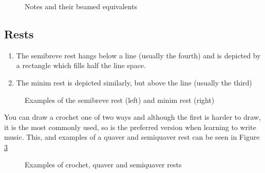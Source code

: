 \begin{figure}[h!]
  \centering
  \caption{Notes and their beamed equivalents}
  \label{fig:NotesBeamedEquiv}
\end{figure}


\subsection*{Rests}

\begin{enumerate}
\item The semibreve rest hangs below a line (usually the fourth) and is depicted by a rectangle which fills half the line space.
\item The minim rest is depicted similarly, but above the line (usually the third)
\end{enumerate}

\begin{figure}[h!]
  \centering
  \caption{Examples of the semibreve rest (left) and minim rest (right)}
  \label{fig:RestMinimSemibreve}
\end{figure}

You can draw a crochet one of two ways and although the first is harder to draw, it is the most commonly used, so is the preferred version when learning to write music. This, and examples of a quaver and semiquaver rest can be seen in Figure \ref{fig:RestCrochetQS}

\begin{figure}[h!]
  \centering
  \caption{Examples of crochet, quaver and semiquaver rests}
  \label{fig:RestCrochetQS}
\end{figure}

